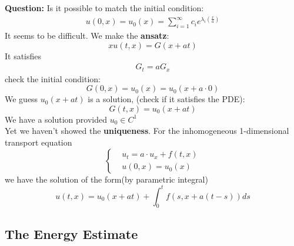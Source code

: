 \documentclass[a4paper,11pt,oneside,fleqn]{book}
\theoremstyle{definition}
\theoremstyle{remark}
\begin{document}
\textbf{Question:} Is it possible to match the initial condition:
\begin{align*}
	u(0, x) = u_0(x) = \sum_{i = 1}^\infty c_i e^{\lambda_i(\frac{x}{a})}
\end{align*}
It seems to be difficult. We make the \textbf{ansatz}:
\begin{equation*}x
	u(t, x) = G(x + at)
\end{equation*}
It satisfies 
\begin{align*}
	G_t = a G_x
\end{align*}
check the initial condition:
\begin{equation*}
	G(0, x) = u_0(x) = u_0(x + a\cdot 0)
\end{equation*}
We guess $u_0(x + at)$ is a solution, (check if it satisfies the PDE):
\begin{equation*}
	G(t,x) = u_0(x + at)
\end{equation*}
We have a solution provided $u_0 \in C^1$
\\
Yet we haven't showed the \textbf{uniqueness}. For the inhomogeneous 1-dimensional transport equation
\begin{equation}\label{TE}
\left\{
	\begin{aligned}
		&u_t = a \cdot u_x + f(t, x)\\
		&u(0, x) = u_0(x)
	\end{aligned}
\right.
\end{equation}
we have the solution of the form(by parametric integral)
\begin{equation} \label{TE: solution}
	u(t, x) = u_0(x + at) + \int_0^t f(s, x + a(t -s))ds
\end{equation}

\subsection{The Energy Estimate}
\end{document}
